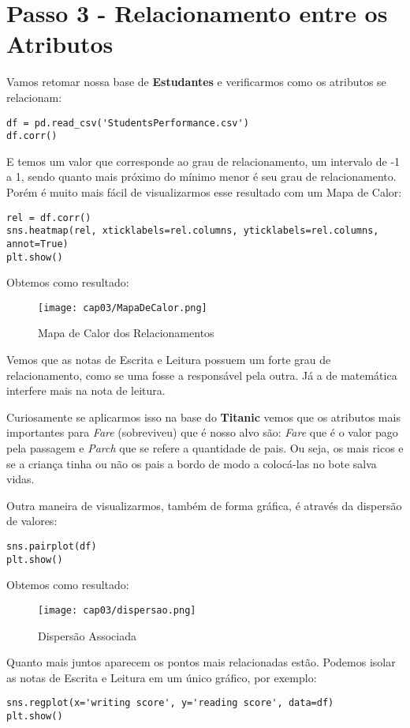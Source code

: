 \section{Passo 3 - Relacionamento entre os Atributos}
Vamos retomar nossa base de \textbf{Estudantes} e verificarmos como os atributos se relacionam:
\begin{lstlisting}[]
df = pd.read_csv('StudentsPerformance.csv')
df.corr()
\end{lstlisting}

E temos um valor que corresponde ao grau de relacionamento, um intervalo de -1 a 1, sendo quanto mais próximo do mínimo menor é seu grau de relacionamento. Porém é muito mais fácil de visualizarmos esse resultado com um Mapa de Calor:
\begin{lstlisting}[]
rel = df.corr()
sns.heatmap(rel, xticklabels=rel.columns, yticklabels=rel.columns, annot=True)
plt.show()
\end{lstlisting}

Obtemos como resultado:
\begin{figure}[H]
	\centering
	\texttt{[image: cap03/MapaDeCalor.png]}
	\caption{Mapa de Calor dos Relacionamentos}
\end{figure}

Vemos que as notas de Escrita e Leitura possuem um forte grau de relacionamento, como se uma fosse a responsável pela outra. Já a de matemática interfere mais na nota de leitura.

Curiosamente se aplicarmos isso na base do \textbf{Titanic} vemos que os atributos mais importantes para \textit{Fare} (sobreviveu) que é nosso alvo são: \textit{Fare} que é o valor pago pela passagem e \textit{Parch} que se refere a quantidade de pais. Ou seja, os mais ricos e se a criança tinha ou não os pais a bordo de modo a colocá-las no bote salva vidas. 

Outra maneira de visualizarmos, também de forma gráfica, é através da dispersão de valores:
\begin{lstlisting}[]
sns.pairplot(df)
plt.show()
\end{lstlisting}

Obtemos como resultado:
\begin{figure}[H]
	\centering
	\texttt{[image: cap03/dispersao.png]}
	\caption{Dispersão Associada}
\end{figure}

Quanto mais juntos aparecem os pontos mais relacionadas estão. Podemos isolar as notas de Escrita e Leitura em um único gráfico, por exemplo:
\begin{lstlisting}[]
sns.regplot(x='writing score', y='reading score', data=df)
plt.show()
\end{lstlisting}

